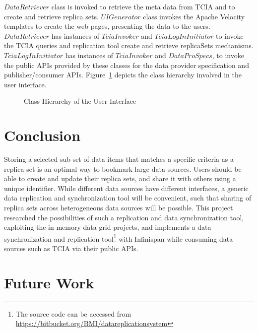 \documentclass[conference]{IEEEtran}
\begin{document}
$DataRetriever$ class is invoked to retrieve the meta data from TCIA and to create and retrieve replica sets. $UIGenerator$ class invokes the Apache Velocity templates to create the web pages, presenting the data to the users. $DataRetriever$ has instances of $TciaInvoker$ and $TciaLogInInitiator$ to invoke the TCIA queries and replication tool create and retrieve replicaSets mechanisms. $TciaLogInInitiator$ has instances of $TciaInvoker$ and $DataProSpecs$, to invoke the public APIs provided by these classes for the data provider specification and publisher/consumer APIs. Figure~\ref{fig:classUX} depicts the class hierarchy involved in the user interface.
\begin{figure}[!htbp]
\begin{center}
\end{center}
 \caption{Class Hierarchy of the User Interface}
 \label{fig:classUX}
\end{figure}

\section{Conclusion}
Storing a selected sub set of data items that matches a specific criteria as a replica set is an optimal way to bookmark large data sources. Users should be able to create and update their replica sets, and share it with others using a unique identifier. While different data sources have different interfaces, a generic data replication and synchronization tool will be convenient, such that sharing of replica sets across heterogeneous data sources will be possible. This project researched the possibilities of such a replication and data synchronization tool, exploiting the in-memory data grid projects, and implements a data synchronization and replication tool\footnote{The source code can be accessed from \url{https://bitbucket.org/BMI/datareplicationsystem}} with Infinispan while consuming data sources such as TCIA via their public APIs.

\section{Future Work}
\end{document}
